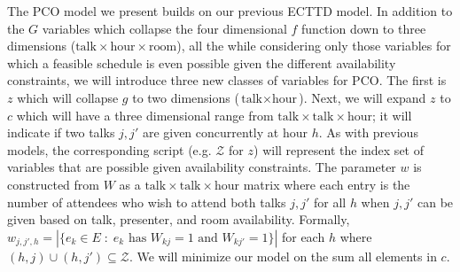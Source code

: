 \documentclass{svjour3}                     %
\begin{document}
The PCO model we present builds on our previous ECTTD model. 
In addition to the $G$ variables which collapse the four dimensional $f$ function down to three dimensions ($\text{talk} \times \text{hour} \times \text{room}$), all the while considering only those variables for which a feasible schedule is even possible given the different availability constraints, we will introduce three new classes of variables for PCO. 
The first is $z$ which will collapse $g$ to two dimensions ($\text{talk} \times \text{hour}$). 
Next, we will expand $z$ to $c$ which will have a three dimensional range from $\text{talk} \times \text{talk} \times \text{hour}$; it will indicate if two talks $j, j'$ are given concurrently at hour $h$. 
As with previous models, the corresponding script (e.g. $\mathcal Z$ for $z$) will represent the index set of variables that are possible given availability constraints. 
The parameter $w$ is constructed from $W$ as a $\text{talk} \times \text{talk} \times \text{hour}$ matrix where each entry is the number of attendees who wish to attend both talks $j,j'$ for all $h$ when $j,j'$ can be given based on talk, presenter, and room availability. 
Formally, $w_{j,j',h} = |\{e_k \in E \; : \; e_k \text{ has } W_{kj} = 1 \text{ and } W_{kj'} = 1 \}|$ for each $h$ where $(h,j)\cup(h,j') \subseteq \mathcal{Z}$. 
We will minimize our model on the sum all elements in $c$.
\end{document}
